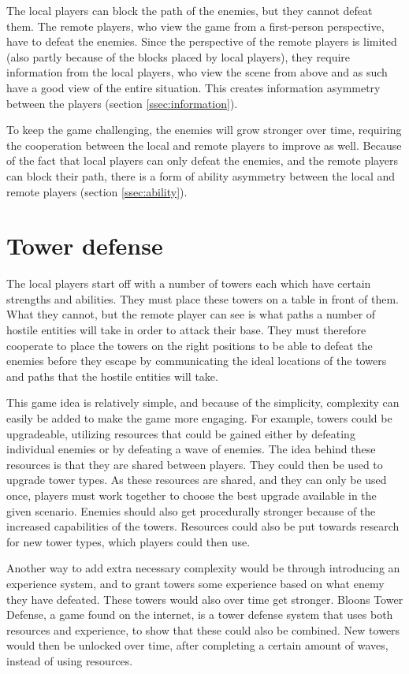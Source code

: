 	The local players can block the path of the enemies, but they cannot defeat
	them. The remote players, who view the game from a first-person perspective,
	have to defeat the enemies. Since the perspective of the remote players is
	limited (also partly because of the blocks placed by local players), they
	require information from the local players, who view the scene from above
	and as such have a good view of the entire situation. This creates
	information asymmetry between the players (section \ref{ssec:information}).

	To keep the game challenging, the enemies will grow stronger over time,
	requiring the cooperation between the local and remote players to improve
	as well. Because of the fact that local players can only defeat the enemies,
	and the remote players can block their path, there is a form of ability
	asymmetry between the local and remote players (section \ref{ssec:ability}).

\section{Tower defense} \label{sec:towerdefense}
	The local players start off with a number of towers each
	which have certain strengths and abilities. They must place
	these towers on a table in front of them. What they cannot,
	but the remote player can see is what paths a number of
	hostile entities will take in order to attack their base.
	They must therefore cooperate to place the towers on the right
	positions to be able to defeat the enemies before they escape
	by communicating the ideal locations of the
	towers and paths that the hostile entities will take.

	This game idea is relatively simple, and because of the simplicity,
	complexity can easily be added to make the game more engaging. For
	example, towers could be upgradeable, utilizing resources that
	could be gained either by defeating individual enemies or by defeating
	a wave of enemies. The idea behind these resources is that they are
	shared between players. They could then be used to upgrade
	tower types. As these resources are shared, and they can only be
	used once, players must work together to choose the best upgrade
	available in the given scenario. Enemies should also get procedurally
	stronger because of the increased capabilities of the towers. Resources
	could also be put towards research for new tower types, which players
	could then use.

	Another way to add extra necessary complexity would be through
	introducing an experience system, and to grant towers some experience based
	on what enemy they have defeated. These towers would also over time get
	stronger. Bloons Tower Defense, a game found on the internet, is a tower
	defense system that uses both resources and experience, to show that these
	could also be combined. New towers would then be unlocked over time, after
	completing a certain amount of waves, instead of using resources.

